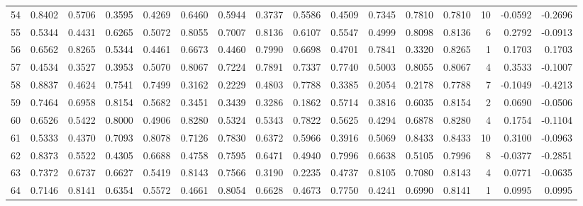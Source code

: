 \begin{tabular}{lrrrrrrrrrrrrrrr}
54  &      0.8402 &  0.5706 &  0.3595 &  0.4269 &  0.6460 &  0.5944 &  0.3737 &  0.5586 &  0.4509 &  0.7345 &   0.7810 &     0.7810 &     10 &                   -0.0592 &                    -0.2696 \\
55  &      0.5344 &  0.4431 &  0.6265 &  0.5072 &  0.8055 &  0.7007 &  0.8136 &  0.6107 &  0.5547 &  0.4999 &   0.8098 &     0.8136 &      6 &                    0.2792 &                    -0.0913 \\
56  &      0.6562 &  0.8265 &  0.5344 &  0.4461 &  0.6673 &  0.4460 &  0.7990 &  0.6698 &  0.4701 &  0.7841 &   0.3320 &     0.8265 &      1 &                    0.1703 &                     0.1703 \\
57  &      0.4534 &  0.3527 &  0.3953 &  0.5070 &  0.8067 &  0.7224 &  0.7891 &  0.7337 &  0.7740 &  0.5003 &   0.8055 &     0.8067 &      4 &                    0.3533 &                    -0.1007 \\
58  &      0.8837 &  0.4624 &  0.7541 &  0.7499 &  0.3162 &  0.2229 &  0.4803 &  0.7788 &  0.3385 &  0.2054 &   0.2178 &     0.7788 &      7 &                   -0.1049 &                    -0.4213 \\
59  &      0.7464 &  0.6958 &  0.8154 &  0.5682 &  0.3451 &  0.3439 &  0.3286 &  0.1862 &  0.5714 &  0.3816 &   0.6035 &     0.8154 &      2 &                    0.0690 &                    -0.0506 \\
60  &      0.6526 &  0.5422 &  0.8000 &  0.4906 &  0.8280 &  0.5324 &  0.5343 &  0.7822 &  0.5625 &  0.4294 &   0.6878 &     0.8280 &      4 &                    0.1754 &                    -0.1104 \\
61  &      0.5333 &  0.4370 &  0.7093 &  0.8078 &  0.7126 &  0.7830 &  0.6372 &  0.5966 &  0.3916 &  0.5069 &   0.8433 &     0.8433 &     10 &                    0.3100 &                    -0.0963 \\
62  &      0.8373 &  0.5522 &  0.4305 &  0.6688 &  0.4758 &  0.7595 &  0.6471 &  0.4940 &  0.7996 &  0.6638 &   0.5105 &     0.7996 &      8 &                   -0.0377 &                    -0.2851 \\
63  &      0.7372 &  0.6737 &  0.6627 &  0.5419 &  0.8143 &  0.7566 &  0.3190 &  0.2235 &  0.4737 &  0.8105 &   0.7080 &     0.8143 &      4 &                    0.0771 &                    -0.0635 \\
64  &      0.7146 &  0.8141 &  0.6354 &  0.5572 &  0.4661 &  0.8054 &  0.6628 &  0.4673 &  0.7750 &  0.4241 &   0.6990 &     0.8141 &      1 &                    0.0995 &                     0.0995 \\

\end{tabular}

